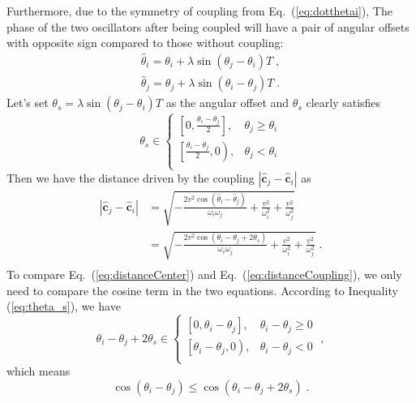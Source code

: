 \documentclass[%
 aip,
 amsmath,amssymb,
 reprint,%
]{revtex4-1}
\begin{document}
Furthermore, due to the symmetry of coupling from Eq.~(\ref{eq:dotthetai}), The phase of the two oscillators after being coupled will have a pair of angular offsets with opposite sign compared to those without coupling:
\begin{equation}
    \begin{array}{c}
        \hat{\theta}_i=\theta _i+\lambda \sin \left( \theta _j-\theta _i \right) T\;,\\
        \hat{\theta}_j=\theta _j+\lambda \sin \left( \theta _i-\theta _j \right) T\;.
    \end{array}
\end{equation}
Let's set $\theta _s=\lambda \sin \left( \theta _j-\theta _i \right) T$ as the angular offset and $\theta _s$ clearly satisfies
\begin{equation}\label{eq:theta_s}
    \theta _s\in \begin{cases}
        \left[ 0, \frac{\theta _i-\theta _j}{2} \right] ,&		\theta _j\geqslant \theta _i\\
        \left[ \frac{\theta _i-\theta _j}{2}, 0 \right) ,&		\theta _j<\theta _i\\
    \end{cases}
\end{equation}
Then we have the distance driven by the coupling $\left| \hat{\mathbf{c}}_j-\hat{\mathbf{c}}_i \right|$ as
\begin{equation}
    \begin{aligned}\label{eq:distanceCoupling}
        \left| \hat{\mathbf{c}}_j-\hat{\mathbf{c}}_i \right|&=\sqrt{-\frac{2v^2\cos \left( \hat{\theta}_i-\hat{\theta}_j \right)}{\omega _i\omega _j}+\frac{v^2}{\omega _{i}^{2}}+\frac{v^2}{\omega _{j}^{2}}}\\
        &=\sqrt{-\frac{2v^2\cos \left( \theta _i-\theta _j+2\theta _s \right)}{\omega _i\omega _j}+\frac{v^2}{\omega _{i}^{2}}+\frac{v^2}{\omega _{j}^{2}}}\;.\\
    \end{aligned}
\end{equation}
To compare Eq.~(\ref{eq:distanceCenter}) and Eq.~(\ref{eq:distanceCoupling}), we only need to compare the cosine term in the two equations. According to Inequality (\ref{eq:theta_s}), we have
\begin{equation}
    \theta _i-\theta _j+2\theta _s\in \begin{cases}
        \left[ 0, \theta _i-\theta _j \right] ,&		\theta _i-\theta _j\geqslant 0\\
        \left[ \theta _i-\theta _j, 0 \right) ,&		\theta _i-\theta _j<0\\
    \end{cases}\;,
\end{equation}
which means
\begin{equation}
    \cos \left( \theta _i-\theta _j \right) \leqslant \cos \left( \theta _i-\theta _j+2\theta _s \right)\;.
\end{equation}
\end{document}
